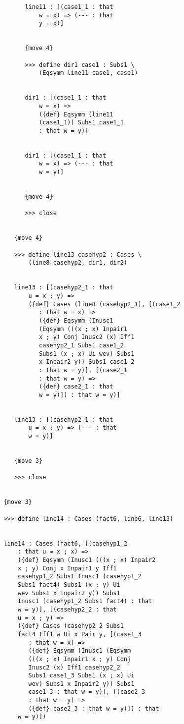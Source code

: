 \documentclass[12pt]{article}
\begin{document}
\begin{verbatim}
               line11 : [(case1_1 : that 
                   w = x) => (--- : that 
                   y = x)]


               {move 4}

               >>> define dir1 case1 : Subs1 \
                   (Eqsymm line11 case1, case1)


               dir1 : [(case1_1 : that 
                   w = x) => 
                   ({def} Eqsymm (line11 
                   (case1_1)) Subs1 case1_1 
                   : that w = y)]


               dir1 : [(case1_1 : that 
                   w = x) => (--- : that 
                   w = y)]


               {move 4}

               >>> close


            {move 4}

            >>> define line13 casehyp2 : Cases \
                (line8 casehyp2, dir1, dir2)


            line13 : [(casehyp2_1 : that 
                u = x ; y) => 
                ({def} Cases (line8 (casehyp2_1), [(case1_2 
                   : that w = x) => 
                   ({def} Eqsymm (Inusc1 
                   (Eqsymm (((x ; x) Inpair1 
                   x ; y) Conj Inusc2 (x) Iff1 
                   casehyp2_1 Subs1 case1_2 
                   Subs1 (x ; x) Ui wev) Subs1 
                   x Inpair2 y)) Subs1 case1_2 
                   : that w = y)], [(case2_1 
                   : that w = y) => 
                   ({def} case2_1 : that 
                   w = y)]) : that w = y)]


            line13 : [(casehyp2_1 : that 
                u = x ; y) => (--- : that 
                w = y)]


            {move 3}

            >>> close


         {move 3}

         >>> define line14 : Cases (fact6, line6, line13)


         line14 : Cases (fact6, [(casehyp1_2 
             : that u = x ; x) => 
             ({def} Eqsymm (Inusc1 (((x ; x) Inpair2 
             x ; y) Conj x Inpair1 y Iff1 
             casehyp1_2 Subs1 Inusc1 (casehyp1_2 
             Subs1 fact4) Subs1 (x ; y) Ui 
             wev Subs1 x Inpair2 y)) Subs1 
             Inusc1 (casehyp1_2 Subs1 fact4) : that 
             w = y)], [(casehyp2_2 : that 
             u = x ; y) => 
             ({def} Cases (casehyp2_2 Subs1 
             fact4 Iff1 w Ui x Pair y, [(case1_3 
                : that w = x) => 
                ({def} Eqsymm (Inusc1 (Eqsymm 
                (((x ; x) Inpair1 x ; y) Conj 
                Inusc2 (x) Iff1 casehyp2_2 
                Subs1 case1_3 Subs1 (x ; x) Ui 
                wev) Subs1 x Inpair2 y)) Subs1 
                case1_3 : that w = y)], [(case2_3 
                : that w = y) => 
                ({def} case2_3 : that w = y)]) : that 
             w = y)])



\end{verbatim}
\end{document}

